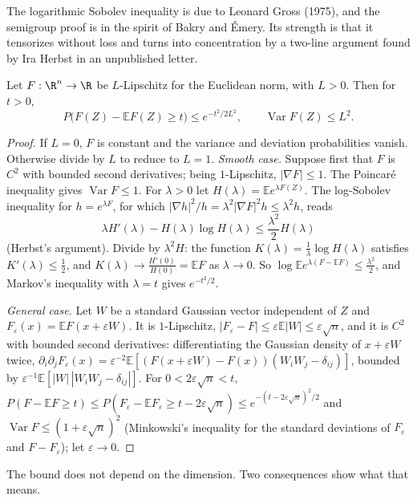 The logarithmic Sobolev inequality is due to Leonard Gross (1975), and the semigroup proof is in the spirit of Bakry and \'Emery. Its strength is that it
tensorizes without loss and turns into concentration by a two-line argument found by Ira Herbst in an unpublished letter.

\begin{theorem}\label{thm:gaussconc}
Let $F:\R^n\to\R$ be $L$-Lipschitz for the Euclidean norm, with $L>0$. Then for $t>0$,
\[
P\bigl(F(Z)-\mathbb EF(Z)\ge t\bigr)\le e^{-t^2/2L^2},\qquad\operatorname{Var}F(Z)\le L^2.
\]
\end{theorem}
\begin{proof}
If $L=0$, $F$ is constant and the variance and deviation probabilities vanish. Otherwise divide by $L$ to reduce to $L=1$. \emph{Smooth case.} Suppose first that $F$ is $C^2$ with bounded second derivatives; being $1$-Lipschitz, $|\nabla F|\le1$. The Poincar\'e inequality gives
$\operatorname{Var}F\le1$. For $\lambda>0$ let $H(\lambda)=\mathbb Ee^{\lambda F(Z)}$. The log-Sobolev inequality for $h=e^{\lambda F}$, for which $|\nabla h|^2/h=\lambda^2|\nabla F|^2h\le\lambda^2h$, reads
\[
\lambda H'(\lambda)-H(\lambda)\log H(\lambda)\le\frac{\lambda^2}2H(\lambda)
\]
(Herbst's argument). Divide by $\lambda^2H$: the function $K(\lambda)=\frac1\lambda\log H(\lambda)$ satisfies $K'(\lambda)\le\frac12$, and $K(\lambda)\to\frac{H'(0)}{H(0)}=\mathbb EF$ as $\lambda\to0$. So
$\log\mathbb Ee^{\lambda(F-\mathbb EF)}\le\frac{\lambda^2}2$, and Markov's inequality with $\lambda=t$ gives $e^{-t^2/2}$.

\emph{General case.} Let $W$ be a standard Gaussian vector independent of $Z$ and $F_\varepsilon(x)=\mathbb EF(x+\varepsilon W)$. It is $1$-Lipschitz, $|F_\varepsilon-F|\le\varepsilon\mathbb E|W|\le\varepsilon\sqrt n$, and it
is $C^2$ with bounded second derivatives: differentiating the Gaussian density of $x+\varepsilon W$ twice,
$\partial_i\partial_jF_\varepsilon(x)=\varepsilon^{-2}\mathbb E[(F(x+\varepsilon W)-F(x))(W_iW_j-\delta_{ij})]$, bounded by $\varepsilon^{-1}\mathbb E[|W|\,|W_iW_j-\delta_{ij}|]$. For $0<2\varepsilon\sqrt n<t$,
$P(F-\mathbb EF\ge t)\le P(F_\varepsilon-\mathbb EF_\varepsilon\ge t-2\varepsilon\sqrt n)\le e^{-(t-2\varepsilon\sqrt n)^2/2}$ and $\operatorname{Var}F\le(1+\varepsilon\sqrt n)^2$ (Minkowski's inequality for the standard deviations of $F_\varepsilon$ and $F-F_\varepsilon$); let $\varepsilon\to0$.
\end{proof}

The bound does not depend on the dimension. Two consequences show what that means.

